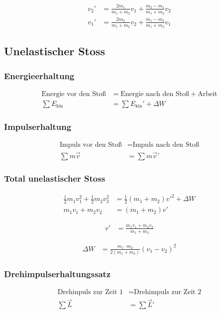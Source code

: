 \begin{align*}
v_2'&=\frac{2m_1}{m_1+m_2}v_1+\frac{m_2-m_1}{m_1+m_2}v_2\\
v_1'&=\frac{2m_2}{m_1+m_2}v_2+\frac{m_1-m_2}{m_1+m_2}v_1
\end{align*}


\subsection{Unelastischer Stoss}

\subsubsection{Energieerhaltung}
\begin{align*}
\text{Energie vor den Stoß} &= \text{Energie nach den Stoß}+\text{Arbeit}\nonumber\\
\sum E_{\text{kin}}&=\sum E_{\text{kin}}'+\Delta W
\end{align*}


\subsubsection{Impulserhaltung}
\begin{align*}
\text{Impuls vor den Stoß} &= \text{Impuls nach den Stoß}\nonumber\\
\sum m\vec{v}&= \sum m\vec{v}'
\end{align*}


\subsubsection{Total unelastischer Stoss}
\begin{align*}
\frac{1}{2}m_1v_1^2+\frac{1}{2}m_2v_2^2&=\frac{1}{2}\left(m_1+m_2\right)v'^2+\Delta W\\
m_1v_1+m_2v_2&=\left(m_1+m_2\right)v'
\end{align*}

\begin{align*}
v'&=\frac{m_1v_1+m_2v_2}{m_1+m_2}
\end{align*}

\begin{align*}
\Delta W	&=\frac{m_1\cdot m_2}{2\left(m_1+m_2\right)}\left(v_1-v_2\right)^2
\end{align*}



\subsubsection{Drehimpulserhaltungssatz}
\begin{align*}
\text{Drehinpuls zur Zeit 1} &= \text{Drehimpuls zur Zeit 2}\\
\sum \vec{L}&=\sum \vec{L}'
\end{align*}


